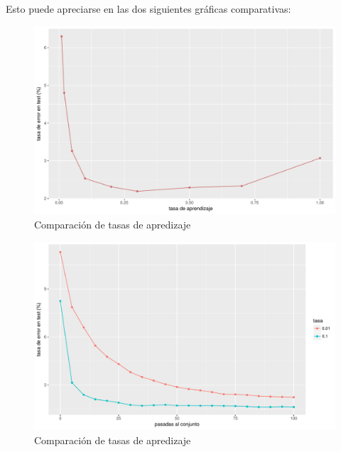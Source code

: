 \documentclass[10pt,a4paper]{article}
\begin{document}
Esto puede apreciarse en las dos siguientes gráficas comparativas:

\begin{figure}[H]
\includegraphics[scale=0.5]{img/tasas.pdf}
\caption{Comparación de tasas de apredizaje}
\end{figure}

\begin{figure}[H]
\includegraphics[scale=0.5]{img/tasa.pdf}
\caption{Comparación de tasas de apredizaje}
\end{figure}
\end{document}
